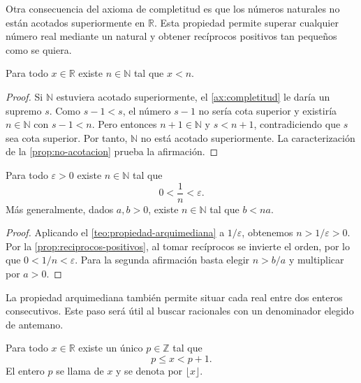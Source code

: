 Otra consecuencia del axioma de completitud es que los números naturales no están acotados superiormente en $\mathbb{R}$. Esta propiedad permite superar cualquier número real mediante un natural y obtener recíprocos positivos tan pequeños como se quiera.

\begin{samepage}
\begin{theorem}
\label{teo:propiedad-arquimediana}
Para todo $x\in\mathbb{R}$ existe $n\in\mathbb{N}$ tal que $x<n$.
\end{theorem}
\end{samepage}

\begin{proof}
Si $\mathbb{N}$ estuviera acotado superiormente, el \cref{ax:completitud} le daría un supremo $s$. Como $s-1<s$, el número $s-1$ no sería cota superior y existiría $n\in\mathbb{N}$ con $s-1<n$. Pero entonces $n+1\in\mathbb{N}$ y $s<n+1$, contradiciendo que $s$ sea cota superior. Por tanto, $\mathbb{N}$ no está acotado superiormente. La caracterización de la \cref{prop:no-acotacion} prueba la afirmación.
\end{proof}

\begin{samepage}
\begin{corollary}
\label{cor:reciprocos-pequenos}
Para todo $\varepsilon>0$ existe $n\in\mathbb{N}$ tal que
\[
 0<\frac1n<\varepsilon.
\]
Más generalmente, dados $a,b>0$, existe $n\in\mathbb{N}$ tal que $b<na$.
\end{corollary}
\end{samepage}

\begin{proof}
Aplicando el \cref{teo:propiedad-arquimediana} a $1/\varepsilon$, obtenemos $n>1/\varepsilon>0$. Por la \cref{prop:reciprocos-positivos}, al tomar recíprocos se invierte el orden, por lo que $0<1/n<\varepsilon$. Para la segunda afirmación basta elegir $n>b/a$ y multiplicar por $a>0$.
\end{proof}

La propiedad arquimediana también permite situar cada real entre dos enteros consecutivos. Este paso será útil al buscar racionales con un denominador elegido de antemano.

\begin{samepage}
\begin{proposition}
\label{prop:parte-entera}
Para todo $x\in\mathbb{R}$ existe un único $p\in\mathbb{Z}$ tal que
\[
 p\leq x<p+1.
\]
El entero $p$ se llama  de $x$ y se denota por $\lfloor x\rfloor$.
\end{proposition}
\end{samepage}


